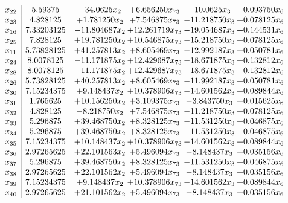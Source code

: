 \documentclass[11pt]{article}
\begin{document}
\[\begin{array}{c| c c@{\hskip 2pt} c@{\hskip 2pt} c@{\hskip 2pt} c@{\hskip 2pt} }
 x_{22}   &  5.59375 & -34.0625 x_{2} & + 6.656250 x_{73} & -10.0625 x_{3} & + 0.093750 x_{6}\\
 x_{23}   &  4.828125 & + 1.781250 x_{2} & + 7.546875 x_{73} & -11.218750 x_{3} & + 0.078125 x_{6}\\
 x_{16}   &  7.33203125 & -11.804687 x_{2} & + 12.261719 x_{73} & -19.054687 x_{3} & + 0.144531 x_{6}\\
 x_{25}   &  7.828125 & + 19.781250 x_{2} & + 10.546875 x_{73} & -15.218750 x_{3} & + 0.078125 x_{6}\\
 x_{11}   &  5.73828125 & + 41.257813 x_{2} & + 8.605469 x_{73} & -12.992187 x_{3} & + 0.050781 x_{6}\\
 x_{24}   &  8.0078125 & -11.171875 x_{2} & + 12.429687 x_{73} & -18.671875 x_{3} & + 0.132812 x_{6}\\
 x_{28}   &  8.0078125 & -11.171875 x_{2} & + 12.429687 x_{73} & -18.671875 x_{3} & + 0.132812 x_{6}\\
 x_{26}   &  5.73828125 & + 40.257813 x_{2} & + 8.605469 x_{73} & -11.992187 x_{3} & + 0.050781 x_{6}\\
 x_{30}   &  7.15234375 & + 9.148437 x_{2} & + 10.378906 x_{73} & -14.601562 x_{3} & + 0.089844 x_{6}\\
 x_{31}   &  1.765625 & + 10.156250 x_{2} & + 3.109375 x_{73} & -3.843750 x_{3} & + 0.015625 x_{6}\\
 x_{32}   &  4.828125 & -8.218750 x_{2} & + 7.546875 x_{73} & -11.218750 x_{3} & + 0.078125 x_{6}\\
 x_{33}   &  5.296875 & + 39.468750 x_{2} & + 8.328125 x_{73} & -11.531250 x_{3} & + 0.046875 x_{6}\\
 x_{34}   &  5.296875 & + 39.468750 x_{2} & + 8.328125 x_{73} & -11.531250 x_{3} & + 0.046875 x_{6}\\
 x_{35}   &  7.15234375 & + 10.148437 x_{2} & + 10.378906 x_{73} & -14.601562 x_{3} & + 0.089844 x_{6}\\
 x_{36}   &  2.97265625 & + 22.101563 x_{2} & + 5.496094 x_{73} & -8.148437 x_{3} & + 0.035156 x_{6}\\
 x_{37}   &  5.296875 & + 39.468750 x_{2} & + 8.328125 x_{73} & -11.531250 x_{3} & + 0.046875 x_{6}\\
 x_{38}   &  2.97265625 & + 22.101562 x_{2} & + 5.496094 x_{73} & -8.148437 x_{3} & + 0.035156 x_{6}\\
 x_{39}   &  7.15234375 & + 9.148437 x_{2} & + 10.378906 x_{73} & -14.601562 x_{3} & + 0.089844 x_{6}\\
 x_{40}   &  2.97265625 & + 21.101562 x_{2} & + 5.496094 x_{73} & -8.148437 x_{3} & + 0.035156 x_{6}\\

\end{array}\]
\end{document}
